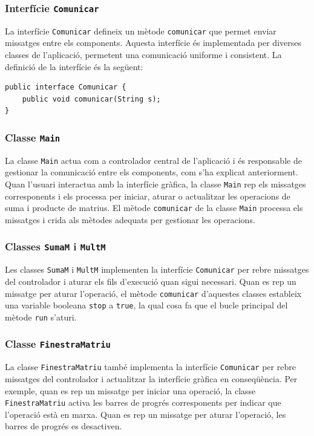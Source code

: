 \documentclass{ieeetj}
\begin{document}
\subsubsection{Interfície \texttt{Comunicar}}
La interfície \texttt{Comunicar} defineix un mètode \texttt{comunicar} que permet enviar missatges entre els components. Aquesta interfície és implementada per diverses classes de l'aplicació, permetent una comunicació uniforme i consistent. La definició de la interfície és la següent:

\begin{verbatim}
public interface Comunicar {
    public void comunicar(String s);
}
\end{verbatim}

\subsubsection{Classe \texttt{Main}}
La classe \texttt{Main} actua com a controlador central de l'aplicació i és responsable de gestionar la comunicació entre els components, com s'ha explicat anteriorment. Quan l'usuari interactua amb la interfície gràfica, la classe \texttt{Main} rep els missatges corresponents i els processa per iniciar, aturar o actualitzar les operacions de suma i producte de matrius. El mètode \texttt{comunicar} de la classe \texttt{Main} processa els missatges i crida als mètodes adequats per gestionar les operacions.

\subsubsection{Classes \texttt{SumaM} i \texttt{MultM}}
Les classes \texttt{SumaM} i \texttt{MultM} implementen la interfície \texttt{Comunicar} per rebre missatges del controlador i aturar els fils d'execució quan sigui necessari. Quan es rep un missatge per aturar l'operació, el mètode \texttt{comunicar} d'aquestes classes estableix una variable booleana \texttt{stop} a \texttt{true}, la qual cosa fa que el bucle principal del mètode \texttt{run} s'aturi.

\subsubsection{Classe \texttt{FinestraMatriu}}
La classe \texttt{FinestraMatriu} també implementa la interfície \texttt{Comunicar} per rebre missatges del controlador i actualitzar la interfície gràfica en conseqüència. Per exemple, quan es rep un missatge per iniciar una operació, la classe \texttt{FinestraMatriu} activa les barres de progrés corresponents per indicar que l'operació està en marxa. Quan es rep un missatge per aturar l'operació, les barres de progrés es desactiven.
\end{document}
